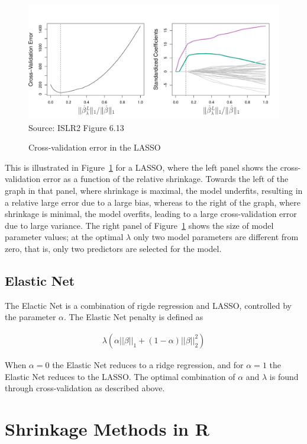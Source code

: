 \begin{figure}
\centering
\includegraphics[width=.85\textwidth]{../class11/Figures_Chapters_1-6/Chapter6/6_13.pdf} \\

\scriptsize Source: ISLR2 Figure 6.13
\caption{Cross-validation error in the LASSO}
\label{fig:lasso2}
\end{figure}

This is illustrated in Figure~\ref{fig:lasso2} for a LASSO, where the left panel shows the cross-validation error as a function of the relative shrinkage. Towards the left of the graph in that panel, where shrinkage is maximal, the model underfits, resulting in a relative large error due to a large bias, whereas to the right of the graph, where shrinkage is minimal, the model overfits, leading to a large cross-validation error due to large variance. The right panel of Figure~\ref{fig:lasso2} shows the size of model parameter values; at the optimal $\lambda$ only two model parameters are different from zero, that is, only two predictors are selected for the model. 

\subsection{Elastic Net}

The Elactic Net is a combination of rigde regression and LASSO, controlled by the parameter $\alpha$. The Elastic Net penalty is defined as

\begin{align*}
\lambda \left( \alpha ||\beta||_1  + (1-\alpha)||\beta||_2^2 \right)
\end{align*}

When $\alpha=0$ the Elastic Net reduces to a ridge regression, and for $\alpha=1$ the Elastic Net reduces to the LASSO. The optimal combination of $\alpha$ and $\lambda$ is found through cross-validation as described above.


\section{Shrinkage Methods in R}

